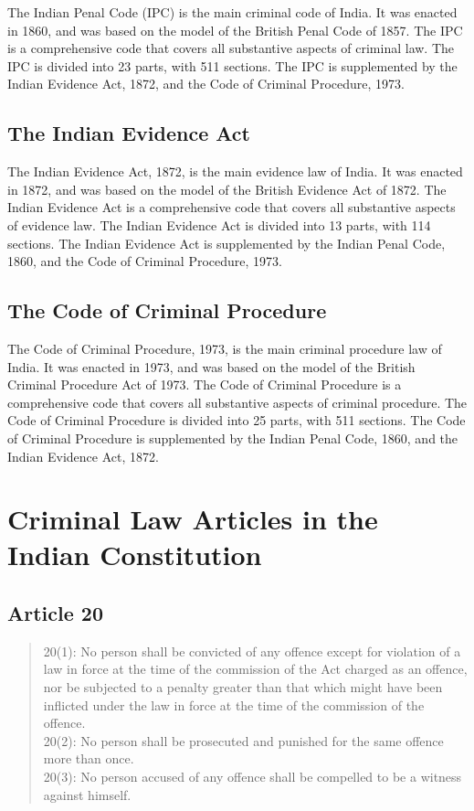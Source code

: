 \documentclass[11pt]{article}
\begin{document}
The Indian Penal Code (IPC) is the main criminal code of India. It was enacted in 1860, and was based on the model of the British Penal Code of 1857. The IPC is a comprehensive code that covers all substantive aspects of criminal law. The IPC is divided into 23 parts, with 511 sections. The IPC is supplemented by the Indian Evidence Act, 1872, and the Code of Criminal Procedure, 1973.

\subsection{The Indian Evidence Act}

The Indian Evidence Act, 1872, is the main evidence law of India. It was enacted in 1872, and was based on the model of the British Evidence Act of 1872. The Indian Evidence Act is a comprehensive code that covers all substantive aspects of evidence law. The Indian Evidence Act is divided into 13 parts, with 114 sections. The Indian Evidence Act is supplemented by the Indian Penal Code, 1860, and the Code of Criminal Procedure, 1973.

\subsection{The Code of Criminal Procedure}

The Code of Criminal Procedure, 1973, is the main criminal procedure law of India. It was enacted in 1973, and was based on the model of the British Criminal Procedure Act of 1973. The Code of Criminal Procedure is a comprehensive code that covers all substantive aspects of criminal procedure. The Code of Criminal Procedure is divided into 25 parts, with 511 sections. The Code of Criminal Procedure is supplemented by the Indian Penal Code, 1860, and the Indian Evidence Act, 1872.


\section{Criminal Law Articles in the Indian Constitution}


\subsection{Article 20}
\begin{quote}
	20(1): No person shall be convicted of any offence except for violation of a law in force at the time of the commission of the Act charged as an offence, nor be subjected to a penalty greater than that which might have been inflicted under the law in force at the time of the commission of the offence.\\
	20(2): No person shall be prosecuted and punished for the same offence more than once.\\
	20(3): No person accused of any offence shall be compelled to be a witness against himself.\\
\end{quote}
\end{document}
